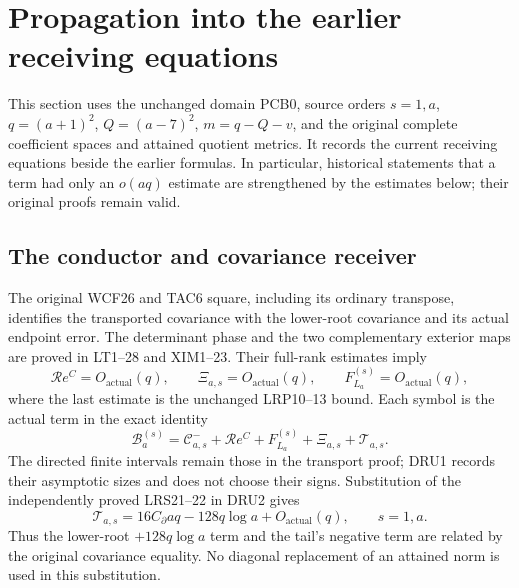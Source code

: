 \documentclass[11pt,a4paper]{article}
\begin{document}

\begingroup
\section{Propagation into the earlier receiving equations}
\label{sec:DRU}

This section uses the unchanged domain PCB0, source orders $s=1,a$,
$q=(a+1)^2$, $Q=(a-7)^2$, $m=q-Q-v$, and the original complete
coefficient spaces and attained quotient metrics.  It records the
current receiving equations beside the earlier formulas.  In particular,
historical statements that a term had only an $o(aq)$ estimate are
strengthened by the estimates below; their original proofs remain valid.

\subsection{The conductor and covariance receiver}
The original WCF26 and TAC6 square, including its ordinary transpose,
identifies the transported covariance with the lower-root covariance
and its actual endpoint error.  The determinant phase and the two
complementary exterior maps are proved in LT1--28 and XIM1--23.
Their full-rank estimates imply
\[
 \mathcal R e^C=O_{\mathrm{actual}}(q),\qquad
 \Xi_{a,s}=O_{\mathrm{actual}}(q),\qquad
 F_{L_a}^{(s)}=O_{\mathrm{actual}}(q),
 \tag{DRU1}
\]
where the last estimate is the unchanged LRP10--13 bound.  Each symbol
is the actual term in the exact identity
\[
 \mathcal B_a^{(s)}=
 \mathcal C^-_{a,s}+\mathcal R e^C+
 F_{L_a}^{(s)}+\Xi_{a,s}+\mathcal T_{a,s}.
 \tag{DRU2}
\]
The directed finite intervals remain those in the transport proof;
DRU1 records their asymptotic sizes and does not choose their signs.
Substitution of the independently proved LRS21--22 in DRU2 gives
\[
 \mathcal T_{a,s}
 =16C_\partial aq-128q\log a+O_{\mathrm{actual}}(q),
 \qquad s=1,a.
 \tag{DRU3}
\]
Thus the lower-root $+128q\log a$ term and the tail's negative term
are related by the original covariance equality.  No diagonal
replacement of an attained norm is used in this substitution.
\end{document}
